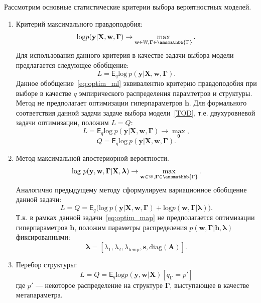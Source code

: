 Рассмотрим основные статистические критерии выбора вероятностных моделей. 
\begin{enumerate}
\item Критерий максимального правдоподобия:
\[\text{log}p(\mathbf{y}|\mathbf{X},\mathbf{w}, \boldsymbol{\Gamma})\to \max_{\mathbf{w}\in \mathbb{W}, \boldsymbol{\Gamma}\in \amsmathbb{\Gamma}}.\]
Для использования данного критерия в качестве задачи выбора модели предлагается следующее обобщение:
\begin{equation}
\label{eq:optim_ml}
    L =  \mathsf{E}_q \text{log}~p(\mathbf{y}|\mathbf{X}, \mathbf{w}, \boldsymbol{\Gamma}).
\end{equation}
Данное обобщение~\eqref{eq:optim_ml} эквивалентно  критерию правдоподобия при выборе в качестве $q$ эмпирического распределения парамтетров и структуры.
Метод не предполагает оптимизации гиперпараметров $\mathbf{h}$. Для формального соответствия данной задачи задаче выбора модели~\eqref{TOD}, т.е. двухуровневой задачи оптимизации, положим $L=Q:$
\[
    L =  \mathsf{E}_q \text{log}~p(\mathbf{y}|\mathbf{X}, \mathbf{w}, \boldsymbol{\Gamma}) \to \max_{\boldsymbol{\theta}},
\]
\[
    Q =  \mathsf{E}_q \text{log}~p(\mathbf{y}|\mathbf{X}, \mathbf{w}, \boldsymbol{\Gamma}).
\]



\item Метод максимальной апостериорной вероятности. 
\[\text{log}~p(\mathbf{y},\mathbf{w},\boldsymbol{\Gamma}|\mathbf{X}, \boldsymbol{\lambda} )\to \max_{\mathbf{w} \in \mathbb{W}, \boldsymbol{\Gamma}\in \amsmathbb{\Gamma}}.\]
Аналогично предыдущему методу сформулируем вариационное обобщение данной задачи:
\begin{equation}
\label{eq:optim_map}
L=Q =\mathsf{E}_q\bigl(\text{log}~p(\mathbf{y}|\mathbf{X}, \mathbf{w},\boldsymbol{\Gamma})+\text{log}p(\mathbf{w}, \boldsymbol{\Gamma}|\boldsymbol{\lambda})\bigr).
\end{equation}
Т.к. в рамках данной задачи~\eqref{eq:optim_map} не предполагается оптимизации гиперпараметров $\mathbf{h}$, положим параметры распределения $p(\mathbf{w}, \boldsymbol{\Gamma}|\mathbf{h}, \boldsymbol{\lambda})$ фиксированными:
\[
    \boldsymbol{\lambda} = [\lambda_1, \lambda_2, \lambda_{\text{temp}}, \mathbf{s}, \text{diag}(\mathbf{A})].
\]

\item Перебор структуры:
\begin{equation}
\label{eq:optim_struct}
    L =  Q = \mathsf{E}_q\text{log}p(\mathbf{y}, \mathbf{w}|\mathbf{X})[q_{\boldsymbol{\Gamma}} = p']
\end{equation}
где $p'$ --- некоторое распределение на структуре $\boldsymbol{\Gamma}$, выступающее в качестве метапараметра.





\end{enumerate}
